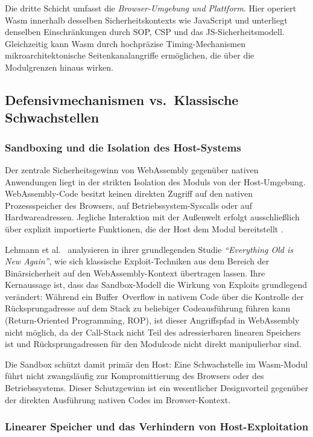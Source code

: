 Die dritte Schicht umfasst die \textit{Browser-Umgebung und Plattform}. Hier operiert Wasm innerhalb desselben Sicherheitskontexts wie JavaScript und unterliegt denselben Einschränkungen durch SOP, CSP und das JS-Sicherheitsmodell. Gleichzeitig kann Wasm durch hochpräzise Timing-Mechanismen mikroarchitektonische Seitenkanalangriffe ermöglichen, die über die Modulgrenzen hinaus wirken.

\subsection{Defensivmechanismen vs.\ Klassische Schwachstellen}

\subsubsection{Sandboxing und die Isolation des Host-Systems}

Der zentrale Sicherheitsgewinn von WebAssembly gegenüber nativen Anwendungen liegt in der strikten Isolation des Moduls von der Host-Umgebung. WebAssembly-Code besitzt keinen direkten Zugriff auf den nativen Prozessspeicher des Browsers, auf Betriebssystem-Syscalls oder auf Hardwareadressen. Jegliche Interaktion mit der Außenwelt erfolgt ausschließlich über explizit importierte Funktionen, die der Host dem Modul bereitstellt \cite{wasmcoreW3C}.

Lehmann et al.~\cite{255318} analysieren in ihrer grundlegenden Studie \textit{``Everything Old is New Again''}, wie sich klassische Exploit-Techniken aus dem Bereich der Binärsicherheit auf den WebAssembly-Kontext übertragen lassen. Ihre Kernaussage ist, dass das Sandbox-Modell die Wirkung von Exploits grundlegend verändert: Während ein Buffer~Overflow in nativem Code über die Kontrolle der Rücksprungadresse auf dem Stack zu beliebiger Codeausführung führen kann (Return-Oriented Programming, ROP), ist dieser Angriffspfad in WebAssembly nicht möglich, da der Call-Stack nicht Teil des adressierbaren linearen Speichers ist und Rücksprungadressen für den Modulcode nicht direkt manipulierbar sind.

Die Sandbox schützt damit primär den Host: Eine Schwachstelle im Wasm-Modul führt nicht zwangsläufig zur Kompromittierung des Browsers oder des Betriebssystems. Dieser Schutzgewinn ist ein wesentlicher Designvorteil gegenüber der direkten Ausführung nativen Codes im Browser-Kontext.

\subsubsection{Linearer Speicher und das Verhindern von Host-Exploitation}


